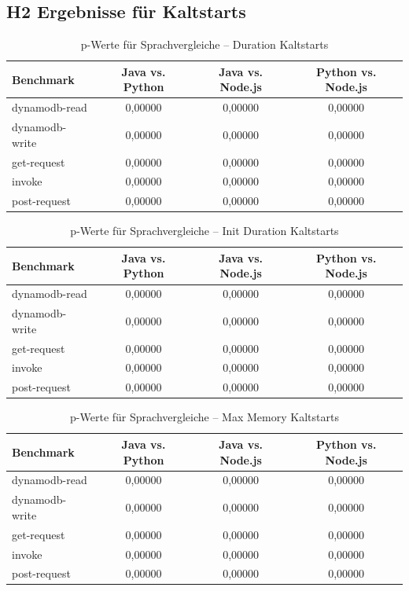 \subsection{H2 Ergebnisse für Kaltstarts}
\label{boot:res:cold}
\begin{table}[H]
\centering
\footnotesize
\caption{p-Werte für Sprachvergleiche – Duration Kaltstarts}
\label{app:boot-h2-duration}
\begin{tabular}{|l|c|c|c|}
\hline
\textbf{Benchmark} & \textbf{Java vs. Python} & \textbf{Java vs. Node.js} & \textbf{Python vs. Node.js} \\
\hline
dynamodb-read   & 0,00000 & 0,00000 & 0,00000 \\
dynamodb-write  & 0,00000 & 0,00000 & 0,00000 \\
get-request     & 0,00000 & 0,00000 & 0,00000 \\
invoke          & 0,00000 & 0,00000 & 0,00000 \\
post-request    & 0,00000 & 0,00000 & 0,00000 \\
\hline
\end{tabular}
\end{table}

\begin{table}[H]
\centering
\footnotesize
\caption{p-Werte für Sprachvergleiche – Init Duration Kaltstarts}
\label{app:boot-h2-init}
\begin{tabular}{|l|c|c|c|}
\hline
\textbf{Benchmark} & \textbf{Java vs. Python} & \textbf{Java vs. Node.js} & \textbf{Python vs. Node.js} \\
\hline
dynamodb-read   & 0,00000 & 0,00000 & 0,00000 \\
dynamodb-write  & 0,00000 & 0,00000 & 0,00000 \\
get-request     & 0,00000 & 0,00000 & 0,00000 \\
invoke          & 0,00000 & 0,00000 & 0,00000 \\
post-request    & 0,00000 & 0,00000 & 0,00000 \\
\hline
\end{tabular}
\end{table}

\begin{table}[H]
\centering
\footnotesize
\caption{p-Werte für Sprachvergleiche – Max Memory Kaltstarts}
\label{app:boot-h2-memory}
\begin{tabular}{|l|c|c|c|}
\hline
\textbf{Benchmark} & \textbf{Java vs. Python} & \textbf{Java vs. Node.js} & \textbf{Python vs. Node.js} \\
\hline
dynamodb-read   & 0,00000 & 0,00000 & 0,00000 \\
dynamodb-write  & 0,00000 & 0,00000 & 0,00000 \\
get-request     & 0,00000 & 0,00000 & 0,00000 \\
invoke          & 0,00000 & 0,00000 & 0,00000 \\
post-request    & 0,00000 & 0,00000 & 0,00000 \\
\hline
\end{tabular}
\end{table}

